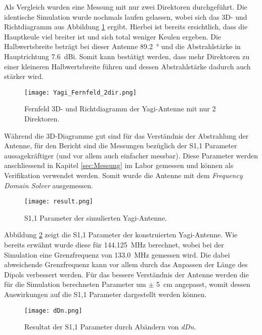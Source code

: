 Als Vergleich wurden eine Messung mit nur zwei Direktoren durchgeführt. Die identische Simulation wurde nochmals laufen gelassen, wobei sich das 3D- und Richtdiagramm aus Abbildung \ref{fig:Simulation_Yagi_Fernfeld_2dir} ergibt. Hierbei ist bereits ersichtlich, dass die Hauptkeule viel breiter ist und sich total weniger Keulen ergeben. Die Halbwertsbreite beträgt bei dieser Antenne \SI{89.2}{\degree} und die Abstrahlstärke in Hauptrichtung \SI{7.6}{dBi}. Somit kann bestätigt werden, dass mehr Direktoren zu einer kleineren Halbwertsbreite führen und dessen Abstrahlstärke dadurch auch stärker wird.

\begin{figure}[h!]
	\centering
	\texttt{[image: Yagi\_Fernfeld\_2dir.png]}
	\caption{Fernfeld 3D- und Richtdiagramm der Yagi-Antenne mit nur 2 Direktoren.}
	\label{fig:Simulation_Yagi_Fernfeld_2dir}
\end{figure}

\newpage

Während die 3D-Diagramme gut sind für das Verständnis der Abstrahlung der Antenne, für den Bericht sind die Messungen bezüglich der S1,1 Parameter aussagekräftiger (und vor allem auch einfacher messbar). Diese Parameter werden anschliessend in Kapitel \ref{sec:Messung} im Labor gemessen und können als Verifikation verwendet werden. Somit wurde die Antenne mit dem \textit{Frequency Domain Solver} ausgemessen.

\begin{figure}[h!]
	\centering
	\texttt{[image: result.png]}
	\caption{S1,1 Parameter der simulierten Yagi-Antenne.}
	\label{fig:Simulation_result}
\end{figure}

Abbildung \ref{fig:Simulation_result} zeigt die S1,1 Parameter der konstruierten Yagi-Antenne. Wie bereits erwähnt wurde diese für \SI{144.125}{MHz} berechnet, wobei bei der Simulation eine Grenzfrequenz von \SI{133.0}{MHz} gemessen wird. Die dabei abweichende Grenzfrequenz kann vor allem durch das Anpassen der Länge des Dipols verbessert werden. Für das bessere Verständnis der Antenne werden die für die Simulation berechneten Parameter um $\pm$ \SI{5}{cm} angepasst, womit dessen Auswirkungen auf die S1,1 Parameter dargestellt werden können.

\begin{figure}[h!]
	\centering
	\texttt{[image: dDn.png]}
	\caption{Resultat der S1,1 Parameter durch Abändern von \textit{dDn}.}
	\label{fig:Simulation_dDn}
\end{figure}

